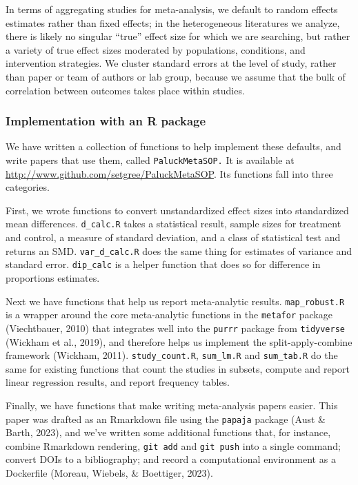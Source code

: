 \documentclass[
  ,jou]{apa6}
\begin{document}
In terms of aggregating studies for meta-analysis, we default to random effects estimates rather than fixed effects; in the heterogeneous literatures we analyze, there is likely no singular ``true'' effect size for which we are searching, but rather a variety of true effect sizes moderated by populations, conditions, and intervention strategies. We cluster standard errors at the level of study, rather than paper or team of authors or lab group, because we assume that the bulk of correlation between outcomes takes place within studies.

\subsubsection{Implementation with an R package}\label{implementation-with-an-r-package}

We have written a collection of functions to help implement these defaults, and write papers that use them, called \texttt{PaluckMetaSOP.} It is available at \url{http://www.github.com/setgree/PaluckMetaSOP}. Its functions fall into three categories.

First, we wrote functions to convert unstandardized effect sizes into standardized mean differences. \texttt{d\_calc.R} takes a statistical result, sample sizes for treatment and control, a measure of standard deviation, and a class of statistical test and returns an SMD. \texttt{var\_d\_calc.R} does the same thing for estimates of variance and standard error. \texttt{dip\_calc} is a helper function that does so for difference in proportions estimates.

Next we have functions that help us report meta-analytic results. \texttt{map\_robust.R} is a wrapper around the core meta-analytic functions in the \texttt{metafor} package (Viechtbauer, 2010) that integrates well into the \texttt{purrr} package from \texttt{tidyverse} (Wickham et al., 2019), and therefore helps us implement the split-apply-combine framework (Wickham, 2011). \texttt{study\_count.R}, \texttt{sum\_lm.R} and \texttt{sum\_tab.R} do the same for existing functions that count the studies in subsets, compute and report linear regression results, and report frequency tables.

Finally, we have functions that make writing meta-analysis papers easier. This paper was drafted as an Rmarkdown file using the \texttt{papaja} package (Aust \& Barth, 2023), and we've written some additional functions that, for instance, combine Rmarkdown rendering, \texttt{git\ add} and \texttt{git\ push} into a single command; convert DOIs to a bibliography; and record a computational environment as a Dockerfile (Moreau, Wiebels, \& Boettiger, 2023).
\end{document}
